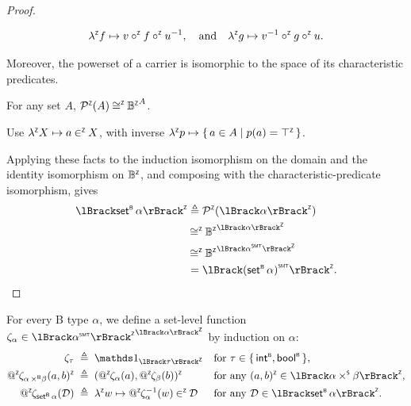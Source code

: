 \begin{proof}
\begin{subproof}
    \[
      \zop{\lambda} f \mapsto v \fcompZ f \fcompZ u^{-1},
      \quad\text{and}\quad
      \zop{\lambda} g \mapsto v^{-1} \fcompZ g \fcompZ u.
      \vspace*{-\baselineskip}
    \]
  \end{subproof}
  Moreover, the powerset of a carrier is isomorphic to the space of its characteristic predicates.
  \begin{fact}
    For any set \(A\), \(\mathop{\mathcal{P}^{\scriptscriptstyle{\mathsf{Z}}}}(A) \mathbin{\cong^{\scriptscriptstyle{\mathsf{Z}}}} {\mathbb{B}^{\scriptscriptstyle{\mathsf{Z}}}}^A\).
  \end{fact}
  \begin{subproof}
    Use \(\lambda^{\scriptscriptstyle{\mathsf{Z}}} X \mapsto a \mathbin{\in^{\scriptscriptstyle{\mathsf{Z}}}} X\), with inverse
    \(\lambda^{\scriptscriptstyle{\mathsf{Z}}} p \mapsto \{\, a\in A \mid p(a)=\top^{\scriptscriptstyle{\mathsf{Z}}} \,\}\).
  \end{subproof}
  Applying these facts to the induction isomorphism on the domain and the identity isomorphism on \(\mathbb{B}^{\scriptscriptstyle{\mathsf{Z}}}\), and composing with the characteristic-predicate isomorphism, gives
  \[
    \begin{aligned}
      \interpZ{\setB\alpha}
      &\triangleq \powZ(\interpZ{\alpha}) \\
      &\mathbin{\zop{\cong}} {\Zbool}^{\interpZ{\alpha}} \\
      &\mathbin{\zop{\cong}} {\Zbool}^{\interpZ{\toSMT{\alpha}}} \\
      &= \interpZ{\toSMT{(\setB\alpha)}}.
    \end{aligned}
    \vspace*{-\baselineskip}
  \]
\end{proof}

\begin{definition}
  \label{def:beer-canonical-iso}
  For every B type \(\alpha\), we define a set-level function \(\regnotation{\canon{\alpha}} \in {\interpZ{\toSMT{\alpha}}}^{\interpZ{\alpha}}\) by induction on \(\alpha\):
  \begin{align*}
    \canon{\tau} &\;\triangleq\; \Id{\interpZ{\tau}} && \text{for \(\tau \in \{\,\intB, \boolB\,\}\)}, \\
    \appZ\canon{\alpha \prodB \beta}\pairZ{a}{b} &\;\triangleq\; \pairZ{\appZ\canon{\alpha}(a)}{\appZ\canon{\beta}(b)} && \text{for any \(\pairZ{a}{b} \in \interpZ{\alpha \timesS \beta}\)}, \\
    \appZ\canon{\setB \alpha}(\mathcal{D}) &\;\triangleq\;
      \zop{\lambda} w \mapsto
        \appZ\canon{\alpha}^{-1}(w) \mathbin{\zop{\in}} \mathcal{D} && \text{for any \(\mathcal{D} \in \interpZ{\setB \alpha}\)}.
  \end{align*}
\end{definition}

